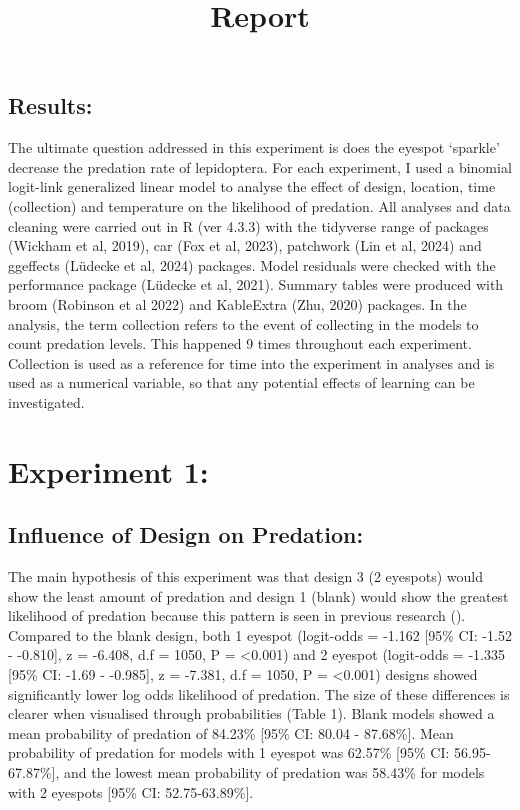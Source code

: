 \documentclass[
]{article}
\title{Report}
\author{}
\date{\vspace{-2.5em}}
\begin{document}
\maketitle

\hypertarget{results}{%
\subsection{Results:}\label{results}}

The ultimate question addressed in this experiment is does the eyespot
`sparkle' decrease the predation rate of lepidoptera. For each
experiment, I used a binomial logit-link generalized linear model to
analyse the effect of design, location, time (collection) and
temperature on the likelihood of predation. All analyses and data
cleaning were carried out in R (ver 4.3.3) with the tidyverse range of
packages (Wickham et al, 2019), car (Fox et al, 2023), patchwork (Lin et
al, 2024) and ggeffects (Lüdecke et al, 2024) packages. Model residuals
were checked with the performance package (Lüdecke et al, 2021). Summary
tables were produced with broom (Robinson et al 2022) and KableExtra
(Zhu, 2020) packages. In the analysis, the term collection refers to the
event of collecting in the models to count predation levels. This
happened 9 times throughout each experiment. Collection is used as a
reference for time into the experiment in analyses and is used as a
numerical variable, so that any potential effects of learning can be
investigated.

\hypertarget{experiment-1}{%
\section{Experiment 1:}\label{experiment-1}}

\hypertarget{influence-of-design-on-predation}{%
\subsection{Influence of Design on
Predation:}\label{influence-of-design-on-predation}}

The main hypothesis of this experiment was that design 3 (2 eyespots)
would show the least amount of predation and design 1 (blank) would show
the greatest likelihood of predation because this pattern is seen in
previous research (). Compared to the blank design, both 1 eyespot
(logit-odds = -1.162 {[}95\% CI: -1.52 - -0.810{]}, z = -6.408, d.f =
1050, P = \textless0.001) and 2 eyespot (logit-odds = -1.335 {[}95\% CI:
-1.69 - -0.985{]}, z = -7.381, d.f = 1050, P = \textless0.001) designs
showed significantly lower log odds likelihood of predation. The size of
these differences is clearer when visualised through probabilities
(Table 1). Blank models showed a mean probability of predation of
84.23\% {[}95\% CI: 80.04 - 87.68\%{]}. Mean probability of predation
for models with 1 eyespot was 62.57\% {[}95\% CI: 56.95-67.87\%{]}, and
the lowest mean probability of predation was 58.43\% for models with 2
eyespots {[}95\% CI: 52.75-63.89\%{]}.
\end{document}
